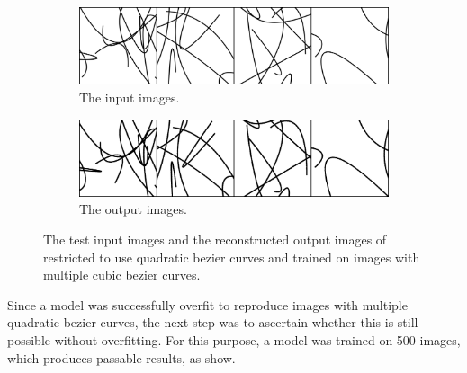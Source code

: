 \begin{figure}
    \centering
    \begin{subfigure}{.45\textwidth}
        \includegraphics[width=\textwidth]{graphics/work-artifacts/im2vec/585/real_img_VectorVAEnLayers_6086.png}
        \caption{The input images.}
    \end{subfigure}
    \begin{subfigure}{.45\textwidth}
        \includegraphics[width=\textwidth]{graphics/work-artifacts/im2vec/585/recons_VectorVAEnLayers_6086.png}
        \caption{The output images.}
    \end{subfigure}
    \caption{The test input images and the reconstructed output images of \citep{DBLP:conf/cvpr/Reddy21} restricted to use quadratic bezier curves and trained on images with multiple cubic bezier curves.}
    \label{fig:585.recons}
\end{figure}

Since a model was successfully overfit to reproduce images with multiple quadratic bezier curves, the next step was to ascertain whether this is still possible without overfitting. For this purpose, a model was trained on 500 images, which produces passable results, as  show.

